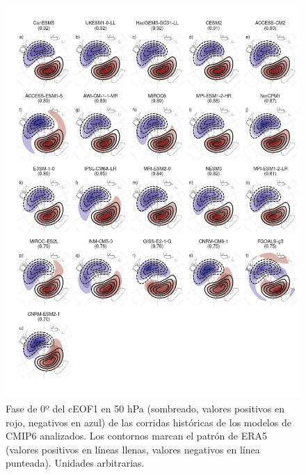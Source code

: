 \documentclass[12pt,oneside,a4paper]{reedthesis}
\begin{document}
\begin{figure}

{\centering \includegraphics{figures/50-cmip6/todos-ceof1-1} 

}

\caption{Fase de 0º del cEOF1 en 50 hPa (sombreado, valores positivos en rojo, negativos en azul) de las corridas históricas de los modelos de CMIP6 analizados. Los contornos marcan el patrón de ERA5 (valores positivos en líneas llenas, valores negativos en línea punteada). Unidades arbitrarias.}\label{fig:todos-ceof1}
\end{figure}
\end{document}
